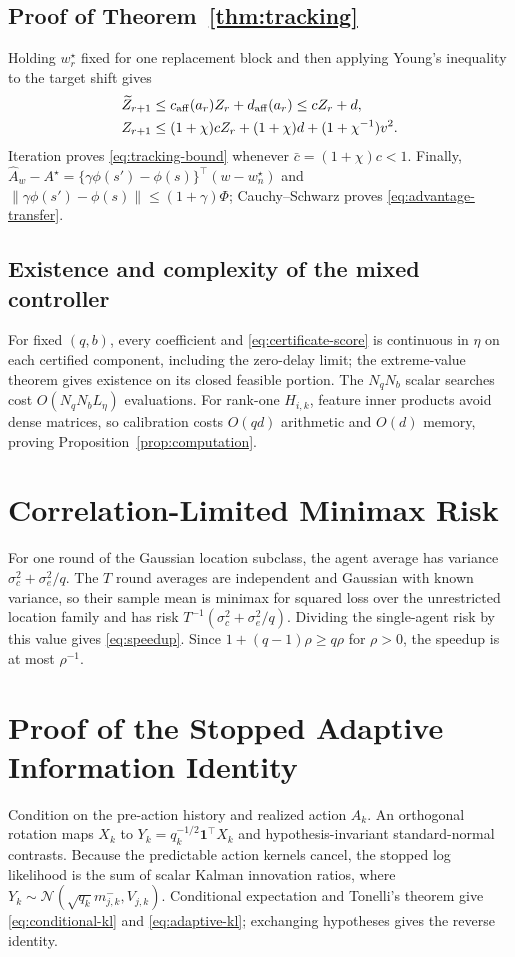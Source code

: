 \subsection{Proof of Theorem~\ref{thm:tracking}}
Holding $w_r^\star$ fixed for one replacement block and then applying Young's inequality to the target shift gives
\begin{align}
\widetilde Z_{r+1}
&\le c_{\rm aff}(a_r)Z_r+d_{\rm aff}(a_r)\le cZ_r+d,\nonumber\\
Z_{r+1}
&\le(1+\chi)cZ_r+(1+\chi)d+(1+\chi^{-1})v^2.
\label{eq:tracking-old-target}
\end{align}
Iteration proves \eqref{eq:tracking-bound} whenever $\bar c=(1+\chi)c<1$.
Finally, $\widehat A_w-A^\star=\{\gamma\phi(s')-\phi(s)\}^\top(w-w_n^\star)$ and $\|\gamma\phi(s')-\phi(s)\|\le(1+\gamma)\Phi$; Cauchy--Schwarz proves \eqref{eq:advantage-transfer}.

\subsection{Existence and complexity of the mixed controller}
For fixed $(q,b)$, every coefficient and \eqref{eq:certificate-score} is continuous in $\eta$ on each certified component, including the zero-delay limit; the extreme-value theorem gives existence on its closed feasible portion.
The $N_qN_b$ scalar searches cost $O(N_qN_bL_\eta)$ evaluations.
For rank-one $H_{i,k}$, feature inner products avoid dense matrices, so calibration costs $O(qd)$ arithmetic and $O(d)$ memory, proving Proposition~\ref{prop:computation}.

\section{Correlation-Limited Minimax Risk}
For one round of the Gaussian location subclass, the agent average has variance $\sigma_c^2+\sigma_e^2/q$.
The $T$ round averages are independent and Gaussian with known variance, so their sample mean is minimax for squared loss over the unrestricted location family and has risk $T^{-1}(\sigma_c^2+\sigma_e^2/q)$.
Dividing the single-agent risk by this value gives \eqref{eq:speedup}.
Since $1+(q-1)\rho\ge q\rho$ for $\rho>0$, the speedup is at most $\rho^{-1}$.

\section{Proof of the Stopped Adaptive Information Identity}
Condition on the pre-action history and realized action $A_k$.
An orthogonal rotation maps $X_k$ to $Y_k=q_k^{-1/2}\bm{1}^\top X_k$ and hypothesis-invariant standard-normal contrasts.
Because the predictable action kernels cancel, the stopped log likelihood is the sum of scalar Kalman innovation ratios, where $Y_k\sim\mathcal N(\sqrt{q_k}m^-_{j,k},V_{j,k})$.
Conditional expectation and Tonelli's theorem give \eqref{eq:conditional-kl} and \eqref{eq:adaptive-kl}; exchanging hypotheses gives the reverse identity.

